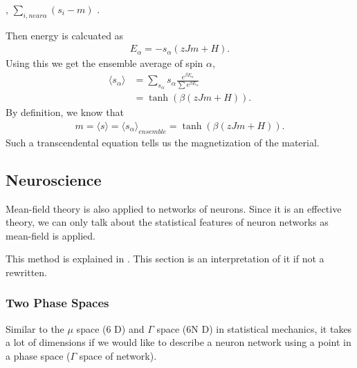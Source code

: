 \documentclass[letterpaper,10pt,english]{sphinxmanual}
\begin{document}
, \(\sum_{i, near \alpha} ( s_i - m)\) .

Then energy is calcuated as
\begin{equation*}
\begin{split}E_\alpha = - s_\alpha (z J m + H).\end{split}
\end{equation*}
Using this we get the ensemble average of spin \(\alpha\),
\begin{equation*}
\begin{split}\langle s_\alpha \rangle &= \sum_{s_\alpha}  s_\alpha \frac{e^{\beta E_\alpha} }{  \sum e^{\beta E_\alpha} } \\
&= \tanh \left( \beta (z J m + H) \right).\end{split}
\end{equation*}
By definition, we know that
\begin{equation*}
\begin{split}m = \langle s \rangle = \langle s_\alpha \rangle_{ensemble} = \tanh \left( \beta (z J m + H) \right).\end{split}
\end{equation*}
Such a transcendental equation tells us the magnetization of the material.


\subsection{Neuroscience}
\label{\detokenize{topics/mean-field:neuroscience}}
Mean-field theory is also applied to networks of neurons. Since it is an effective theory, we can only talk about the statistical features of neuron networks as mean-field is applied.

This method is explained in \label{\detokenize{topics/mean-field:id1}}{\hyperref[\detokenize{topics/mean-field:deco2008}]{\sphinxcrossref{{[}Deco2008{]}}}}. This section is an interpretation of it if not a rewritten.


\subsubsection{Two Phase Spaces}
\label{\detokenize{topics/mean-field:two-phase-spaces}}
Similar to the \(\mu\) space (6 D) and \(\Gamma\) space (6N D) in statistical mechanics, it takes a lot of dimensions if we would like to describe a neuron network using a point in a phase space (\(\Gamma\) space of network).
\end{document}

